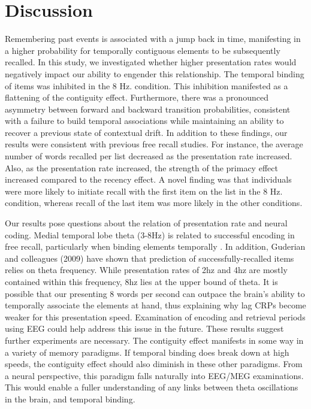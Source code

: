 \documentclass[10pt,letterpaper]{article}
\begin{document}
\section{Discussion}

Remembering past events is associated with a jump back in time, manifesting in a higher probability for temporally contiguous elements to be subsequently recalled. In this study, we investigated whether higher presentation rates would negatively impact our ability to engender this relationship. The temporal binding of items was inhibited in the 8 Hz. condition. This inhibition manifested as a flattening of the contiguity effect. Furthermore, there was a pronounced asymmetry between forward and backward transition probabilities, consistent with a failure to build temporal associations while maintaining an ability to recover a previous state of contextual drift. In addition to these findings, our results were consistent with previous free recall studies. For instance, the average number of words recalled per list decreased as the presentation rate increased. Also, as the presentation rate increased, the strength of the primacy effect increased compared to the recency effect. A novel finding was that individuals were more likely to initiate recall with the first item on the list in the 8 Hz. condition, whereas recall of the last item was more likely in the other conditions.

 Our results pose questions about the relation of presentation rate and neural coding. Medial temporal lobe theta (3-8Hz) is related to successful encoding in free recall, particularly when binding elements temporally \cite{NyhuCurr10}. In addition, Guderian and colleagues (2009) have shown that prediction of successfully-recalled items relies on theta frequency. While presentation rates of 2hz and 4hz are mostly contained within this frequency, 8hz lies at the upper bound of theta. It is possible that our presenting 8 words per second can outpace the brain's ability to temporally associate the elements at hand, thus explaining why lag CRPs become weaker for this presentation speed. Examination of encoding and retrieval periods using EEG could help address this issue in the future. These results suggest further experiments are necessary. The contiguity effect manifests in some way in a variety of memory paradigms. If temporal binding does break down at high speeds, the contiguity effect should also diminish in these other paradigms. From a neural perspective, this paradigm falls naturally into EEG/MEG examinations. This would enable a fuller understanding of any links between theta oscillations in the brain, and temporal binding.

\nocite{GudeEtal09}




\setlength{\bibleftmargin}{.125in}
\setlength{\bibindent}{-\bibleftmargin}


\end{document}
